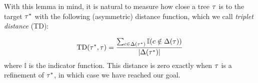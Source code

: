 With this lemma in mind, it is natural to measure how close a tree $\tau$ is to the target $\tau^*$ with the following (asymmetric) distance function, which we call {\it triplet distance} (TD):






\begin{align}
    \mathrm{TD}(\tau^*, \tau) = \frac{\sum_{c \in \Delta(\tau^*)} \mathbb{I}(c \notin \Delta(\tau)) }{|\Delta(\tau^*)|}
\end{align}
where $\mathbb{I}$ is the indicator function.
This distance is zero exactly when $\tau$ is a refinement of $\tau^*$, in which case we have reached our goal. 

